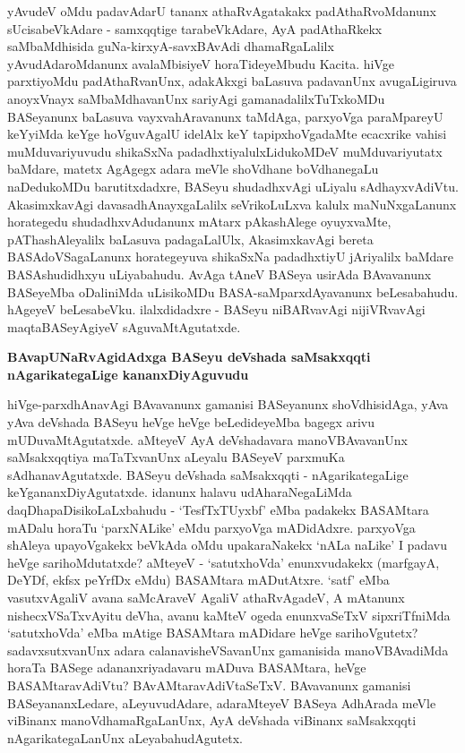 yAvudeV oMdu padavAdarU tananx athaRvAgatakakx padAthaRvoMdanunx sUcisabeVkAdare - samxqqtige tarabeVkAdare, AyA padAthaRkekx saMbaMdhisida guNa-kirxyA-savxBAvAdi dhamaRgaLalilx yAvudAdaroMdanunx avalaMbisiyeV horaTideyeMbudu Kacita. hiVge parxtiyoMdu padAthaRvanUnx, adakAkxgi baLasuva padavanUnx avugaLigiruva anoyxVnayx saMbaMdhavanUnx sariyAgi gamanadalilxTuTxkoMDu BASeyanunx baLasuva vayxvahAravanunx taMdAga, parxyoVga paraMpareyU keYyiMda keYge hoVguvAgalU idelAlx keY tapipxhoVgadaMte ecacxrike vahisi muMduvariyuvudu shikaSxNa padadhxtiyalulxLidukoMDeV muMduvariyutatx baMdare, matetx AgAgegx adara meVle shoVdhane boVdhanegaLu naDedukoMDu barutitxdadxre, BASeyu shudadhxvAgi uLiyalu sAdhayxvAdiVtu. AkasimxkavAgi davasadhAnayxgaLalilx seVrikoLuLxva kalulx maNuNxgaLanunx horategedu shudadhxvAdudanunx mAtarx pAkashAlege oyuyxvaMte, pAThashAleyalilx baLasuva padagaLalUlx, AkasimxkavAgi bereta BASAdoVSagaLanunx horategeyuva shikaSxNa padadhxtiyU jAriyalilx baMdare BASAshudidhxyu uLiyabahudu. AvAga tAneV BASeya usirAda BAvavanunx BASeyeMba oDaliniMda uLisikoMDu BASA-saMparxdAyavanunx beLesabahudu. hAgeyeV beLesabeVku. ilalxdidadxre - BASeyu niBARvavAgi nijiVRvavAgi maqtaBASeyAgiyeV sAguvaMtAgutatxde.

\noindent
\textbf{BAvapUNaRvAgidAdxga BASeyu deVshada saMsakxqqti nAgarikategaLige kananxDiyAguvudu}\label{page16}

hiVge-parxdhAnavAgi BAvavanunx gamanisi BASeyanunx shoVdhisidAga, yAva yAva deVshada BASeyu heVge heVge beLedideyeMba bagegx arivu mUDuvaMtAgutatxde. aMteyeV AyA deVshadavara manoVBAvavanUnx saMsakxqqtiya maTaTxvanUnx aLeyalu BASeyeV parxmuKa sAdhanavAgutatxde. BASeyu deVshada saMsakxqqti - nAgarikategaLige keYgananxDiyAgutatxde. idanunx halavu udAharaNegaLiMda daqDhapaDisikoLaLxbahudu - `TesfTxTUyxbf' eMba padakekx BASAMtara mADalu horaTu `parxNALike' eMdu parxyoVga mADidAdxre. parxyoVga shAleya upayoVgakekx beVkAda oMdu upakaraNakekx `nALa naLike' I padavu heVge sarihoMdutatxde? aMteyeV - `satutxhoVda' enunxvudakekx (marfgayA, DeYDf, ekfsx peYrfDx eMdu) BASAMtara mADutAtxre. `satf' eMba vasutxvAgaliV avana saMcAraveV AgaliV athaRvAgadeV, A mAtanunx nishecxVSaTxvAyitu deVha, avanu kaMteV ogeda enunxvaSeTxV sipxriTfniMda `satutxhoVda' eMba mAtige BASAMtara mADidare heVge sarihoVgutetx? sadavxsutxvanUnx adara calanavisheVSavanUnx gamanisida manoVBAvadiMda horaTa BASege adananxriyadavaru mADuva BASAMtara, heVge BASAMtaravAdiVtu? BAvAMtaravAdiVtaSeTxV. BAvavanunx gamanisi BASeyananxLedare, aLeyuvudAdare, adaraMteyeV BASeya AdhArada meVle viBinanx manoVdhamaRgaLanUnx, AyA deVshada viBinanx saMsakxqqti nAgarikategaLanUnx aLeyabahudAgutetx.

